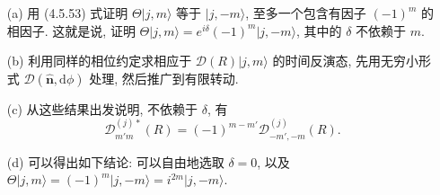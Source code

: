 \documentclass{assignment}
\begin{document}
\begin{prob}[课本习题 4.10]
    \begin{itemize}
        \item[(a)] 用 (4.5.53) 式证明 $\Theta\lvert j,m\rangle$ 等于 $\lvert j,-m\rangle$, 至多一个包含有因子 $(-1)^m$ 的相因子. 这就是说, 证明 $\Theta\lvert j,m\rangle=e^{i\delta}(-1)^m\lvert j,-m\rangle$, 其中的 $\delta$ 不依赖于 $m$.
        \item[(b)] 利用同样的相位约定求相应于 $\mathscr{D}(R)\lvert j,m\rangle$ 的时间反演态, 先用无穷小形式 $\mathscr{D}(\hat{\bm{n}},\mathrm{d}\phi)$ 处理, 然后推广到有限转动.
        \item[(c)] 从这些结果出发说明, 不依赖于 $\delta$, 有
        \[
            \mathscr{D}_{m'm}^{(j)*}(R)=(-1)^{m-m'}\mathscr{D}_{-m',-m}^{(j)}(R).
        \]
        \item[(d)] 可以得出如下结论: 可以自由地选取 $\delta=0$, 以及 $\Theta\lvert j,m\rangle=(-1)^m\lvert j,-m\rangle=i^{2m}\lvert j,-m\rangle$.
    \end{itemize}
\end{prob}
\end{document}
